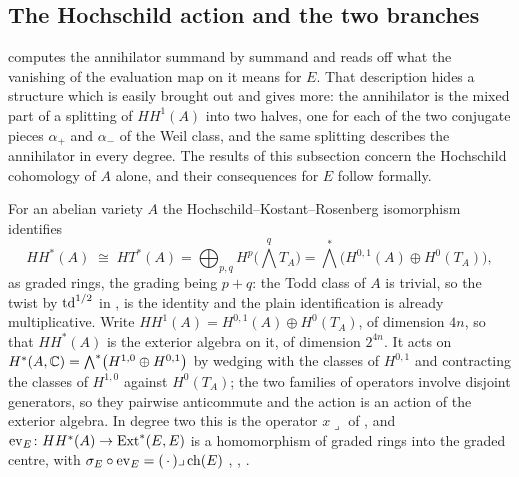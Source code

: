 \subsection{The Hochschild action and the two branches}

 computes the annihilator summand by summand and reads off
what the vanishing of the evaluation map on it means for $E$. That
description hides a structure which is easily brought out and gives more:
the annihilator is the mixed part of a splitting of $HH^{1}(A)$ into two
halves, one for each of the two conjugate pieces $\alpha_{+}$ and
$\alpha_{-}$ of the Weil class, and the same splitting describes the
annihilator in every degree. The results of this subsection concern the
Hochschild cohomology of $A$ alone, and their consequences for $E$ follow
formally.

\begin{setupenv}\label{setup:hh}
For an abelian variety $A$ the Hochschild--Kostant--Rosenberg isomorphism
identifies
\[
  HH^{*}(A)\;\cong\;HT^{*}(A)=\bigoplus_{p,q}H^{p}\bigl(\textstyle\bigwedge^{q}T_{A}\bigr)
  =\textstyle\bigwedge^{*}\bigl(H^{0,1}(A)\oplus H^{0}(T_{A})\bigr),
\]
as graded rings, the grading being $p+q$: the Todd class of $A$ is trivial,
so the twist by $\operatorname{td}^{1/2}$ in \cite{Cal05}, \cite{CRV12} is the identity and
the plain identification is already multiplicative. Write
$HH^{1}(A)=H^{0,1}(A)\oplus H^{0}(T_{A})$, of dimension $4n$, so that
$HH^{*}(A)$ is the exterior algebra on it, of dimension $2^{4n}$. It acts on
$H^{*}(A,\mathbb{C})=\bigwedge^{*}\bigl(H^{1,0}\oplus H^{0,1}\bigr)$ by wedging with
the classes of $H^{0,1}$ and contracting the classes of $H^{1,0}$ against
$H^{0}(T_{A})$; the two families of operators involve disjoint generators, so
they pairwise anticommute and the action is an action of the exterior algebra.
In degree two this is the operator $x\lrcorner$ of , and
$\operatorname{ev}_{E}\colon HH^{*}(A)\to\operatorname{Ext}^{*}(E,E)$ is a homomorphism of
graded rings into the graded centre, with
$\sigma_{E}\circ\operatorname{ev}_{E}=(\,\cdot\,)\lrcorner\operatorname{ch}(E)$
\cite[Section 6]{BF08}, \cite{Cal05}, \cite{CRV12}.
\end{setupenv}

